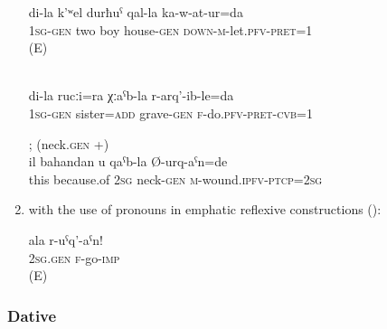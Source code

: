 \begin{enumerate}
\begin{exe}
\begin{xlist}
			\ex	\label{ex:I married off my two sons}
			\gll	di-la k'ʷel durħuˁ qal-la ka-w-at-ur=da\\
				1\textsc{sg}-\textsc{gen}	two	boy	house-\textsc{gen}	\textsc{down-m}-let.\textsc{pfv}-\textsc{pret}=1\\
			\glt	{} (E)
		\end{xlist}

		\ex	{}  \label{ex:(I) buried my sister}\\
		\gll	di-la	rucːi=ra	χːaˁb-la	r-arq'-ib-le=da\\
			1\textsc{sg}-\textsc{gen}	sister=\textsc{add}	grave-\textsc{gen}	\textsc{f}-do.\textsc{pfv}-\textsc{pret}-\textsc{cvb}=1\\
		\glt	{}

		\ex	{} ;   (neck.\textsc{gen} +) \label{ex:Because of this you (masc.) will be beheaded}\\
		\gll	il	bahandan	u	qaˁb-la	Ø-urq-aˁn=de\\
			this	because.of	2\textsc{sg}	neck-\textsc{gen}	\textsc{m}-wound.\textsc{ipfv}-\textsc{ptcp}=2\textsc{sg}\\
		\glt	{}
	\end{exe}

	\item	with the use of  pronouns in emphatic reflexive constructions ():
	\begin{exe}
		\ex	\label{ex:(You) yourself go away}
		\gll	ala	r-uˁq'-aˁn!\\
			2\textsc{sg}.\textsc{gen}	\textsc{f}-go-\textsc{imp}\\
		\glt	{} (E)
	\end{exe}
\end{enumerate}



\subsubsection{Dative}
\label{sssec:Dative}

